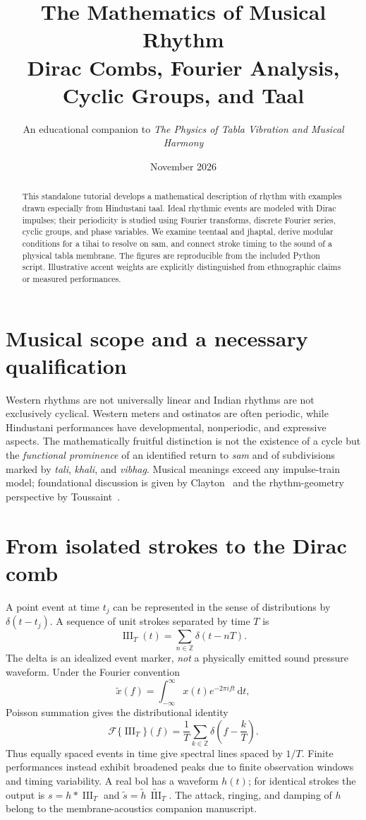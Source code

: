 \documentclass[11pt,letterpaper]{article}
\title{\textbf{The Mathematics of Musical Rhythm}\\[5pt]\large Dirac Combs, Fourier Analysis, Cyclic Groups, and Taal}
\author{An educational companion to \emph{The Physics of Tabla Vibration and Musical Harmony}}
\date{November 2026}
\newcommand{\Z}{\mathbb Z}\newcommand{\R}{\mathbb R}\newcommand{\dd}{\mathrm d}\newcommand{\F}{\mathcal F}
\begin{document}
\maketitle
\begin{abstract}
This standalone tutorial develops a mathematical description of rhythm with examples drawn especially from Hindustani taal. Ideal rhythmic events are modeled with Dirac impulses; their periodicity is studied using Fourier transforms, discrete Fourier series, cyclic groups, and phase variables. We examine teentaal and jhaptal, derive modular conditions for a tihai to resolve on sam, and connect stroke timing to the sound of a physical tabla membrane. The figures are reproducible from the included Python script. Illustrative accent weights are explicitly distinguished from ethnographic claims or measured performances.
\end{abstract}
\tableofcontents
\section{Musical scope and a necessary qualification}
Western rhythms are not universally linear and Indian rhythms are not exclusively cyclical. Western meters and ostinatos are often periodic, while Hindustani performances have developmental, nonperiodic, and expressive aspects. The mathematically fruitful distinction is not the existence of a cycle but the \emph{functional prominence} of an identified return to \emph{sam} and of subdivisions marked by \emph{tali}, \emph{khali}, and \emph{vibhag}. Musical meanings exceed any impulse-train model; foundational discussion is given by Clayton~\cite{clayton} and the rhythm-geometry perspective by Toussaint~\cite{toussaint}.

\section{From isolated strokes to the Dirac comb}
A point event at time $t_j$ can be represented in the sense of distributions by $\delta(t-t_j)$. A sequence of unit strokes separated by time $T$ is
\begin{equation}\operatorname{III}_T(t)=\sum_{n\in\Z}\delta(t-nT).\label{eq:comb}\end{equation}
The delta is an idealized event marker, \emph{not} a physically emitted sound pressure waveform. Under the Fourier convention
\begin{equation}\tilde x(f)=\int_{-\infty}^{\infty}x(t)e^{-2\pi i f t}\,\dd t,\end{equation}
Poisson summation gives the distributional identity
\begin{equation}\boxed{\F\{\operatorname{III}_T\}(f)=\frac1T\sum_{k\in\Z}\delta\!\left(f-\frac{k}{T}\right).}\label{eq:poisson}\end{equation}
Thus equally spaced events in time give spectral lines spaced by $1/T$. Finite performances instead exhibit broadened peaks due to finite observation windows and timing variability. A real bol has a waveform $h(t)$; for identical strokes the output is $s=h*\operatorname{III}_T$ and $\tilde s=\tilde h\,\widetilde{\operatorname{III}}_T$. The attack, ringing, and damping of $h$ belong to the membrane-acoustics companion manuscript.
\end{document}
